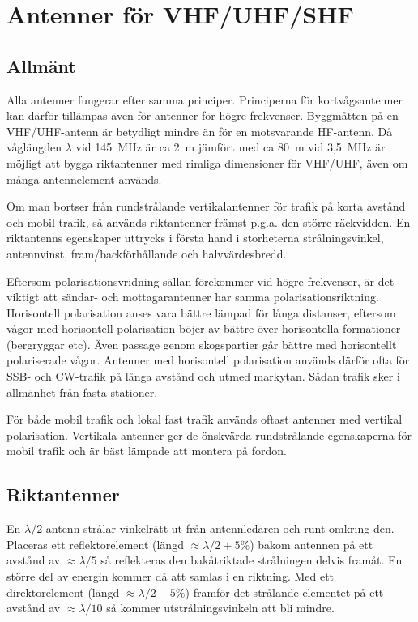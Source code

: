 \section{Antenner för VHF/UHF/SHF}

\subsection{Allmänt}

Alla antenner fungerar efter samma principer.
Principerna för kortvågsantenner kan därför tillämpas även för antenner för
högre frekvenser.
Byggmåtten på en VHF/UHF-antenn är betydligt mindre än för en motsvarande
HF-antenn.
Då våglängden \(\lambda\) vid 145~MHz är ca 2~m jämfört med ca 80~m vid 3,5~MHz
är möjligt att bygga riktantenner med rimliga dimensioner för VHF/UHF, även om
många antennelement används.

Om man bortser från rundstrålande vertikalantenner för trafik på korta avstånd
och mobil trafik, så används riktantenner främst p.g.a. den större räckvidden.
En riktantenns egenskaper uttrycks i första hand i storheterna strålningsvinkel,
antennvinst, fram/backförhållande och halvvärdesbredd.

Eftersom polarisationsvridning sällan förekommer vid högre frekvenser, är det
viktigt att sändar- och mottagarantenner har samma polarisationsriktning.
Horisontell polarisation anses vara bättre lämpad för långa distanser, eftersom
vågor med horisontell polarisation böjer av bättre över horisontella
formationer (bergryggar etc).
Även passage genom skogspartier går bättre med horisontellt polariserade vågor.
Antenner med horisontell polarisation används därför ofta för SSB- och
CW-trafik på långa avstånd och utmed markytan.
Sådan trafik sker i allmänhet från fasta stationer.

För både mobil trafik och lokal fast trafik används oftast antenner med vertikal
polarisation.
Vertikala antenner ger de önskvärda rundstrålande egenskaperna för mobil trafik
och är bäst lämpade att montera på fordon.

\subsection{Riktantenner}
\label{riktantenn}

En \(\lambda/2\)-antenn strålar vinkelrätt ut från antennledaren och
runt omkring den.
Placeras ett reflektorelement (längd \(\approx\lambda/2 + 5\%\)) bakom antennen
på ett avstånd av \(\approx \lambda/5\) så reflekteras den bakåtriktade
strålningen delvis framåt.
En större del av energin kommer då att samlas i en riktning.
Med ett direktorelement (längd \(\approx\lambda/2 - 5\%\)) framför det
strålande elementet på ett avstånd av \(\approx\lambda/10\) så kommer
utstrålningsvinkeln att bli mindre.

